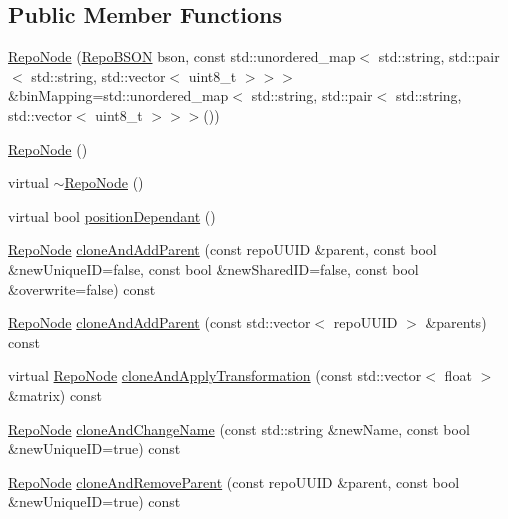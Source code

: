 \subsection*{Public Member Functions}
\begin{DoxyCompactItemize}
\item 
\hyperlink{classrepo_1_1core_1_1model_1_1_repo_node_abec87b9a166ec42041ceced9315acee1}{Repo\+Node} (\hyperlink{classrepo_1_1core_1_1model_1_1_repo_b_s_o_n}{Repo\+B\+S\+O\+N} bson, const std\+::unordered\+\_\+map$<$ std\+::string, std\+::pair$<$ std\+::string, std\+::vector$<$ uint8\+\_\+t $>$$>$$>$ \&bin\+Mapping=std\+::unordered\+\_\+map$<$ std\+::string, std\+::pair$<$ std\+::string, std\+::vector$<$ uint8\+\_\+t $>$$>$$>$())
\item 
\hyperlink{classrepo_1_1core_1_1model_1_1_repo_node_a798034b80fc19d1a83ac60611dad86ea}{Repo\+Node} ()
\item 
virtual \hyperlink{classrepo_1_1core_1_1model_1_1_repo_node_a9d2bfe67f3d2ac044d722bedc5ecdd82}{$\sim$\+Repo\+Node} ()
\item 
virtual bool \hyperlink{classrepo_1_1core_1_1model_1_1_repo_node_aa3e0f98690dc8bfe082d2fc57b904798}{position\+Dependant} ()
\item 
\hyperlink{classrepo_1_1core_1_1model_1_1_repo_node}{Repo\+Node} \hyperlink{classrepo_1_1core_1_1model_1_1_repo_node_abfab119eae3bdc008811dbfe8c2182df}{clone\+And\+Add\+Parent} (const repo\+U\+U\+I\+D \&parent, const bool \&new\+Unique\+I\+D=false, const bool \&new\+Shared\+I\+D=false, const bool \&overwrite=false) const 
\item 
\hyperlink{classrepo_1_1core_1_1model_1_1_repo_node}{Repo\+Node} \hyperlink{classrepo_1_1core_1_1model_1_1_repo_node_afd4ca3df329125f9c1baf654fcdd0b6f}{clone\+And\+Add\+Parent} (const std\+::vector$<$ repo\+U\+U\+I\+D $>$ \&parents) const 
\item 
virtual \hyperlink{classrepo_1_1core_1_1model_1_1_repo_node}{Repo\+Node} \hyperlink{classrepo_1_1core_1_1model_1_1_repo_node_ac31acdb9774bce9296cb5005286db83d}{clone\+And\+Apply\+Transformation} (const std\+::vector$<$ float $>$ \&matrix) const 
\item 
\hyperlink{classrepo_1_1core_1_1model_1_1_repo_node}{Repo\+Node} \hyperlink{classrepo_1_1core_1_1model_1_1_repo_node_a8a6beeff42135007ead59649613df38a}{clone\+And\+Change\+Name} (const std\+::string \&new\+Name, const bool \&new\+Unique\+I\+D=true) const 
\item 
\hyperlink{classrepo_1_1core_1_1model_1_1_repo_node}{Repo\+Node} \hyperlink{classrepo_1_1core_1_1model_1_1_repo_node_ac1b7d9076b255eb4117a6d5a0318fe68}{clone\+And\+Remove\+Parent} (const repo\+U\+U\+I\+D \&parent, const bool \&new\+Unique\+I\+D=true) const 

\end{DoxyCompactItemize}
